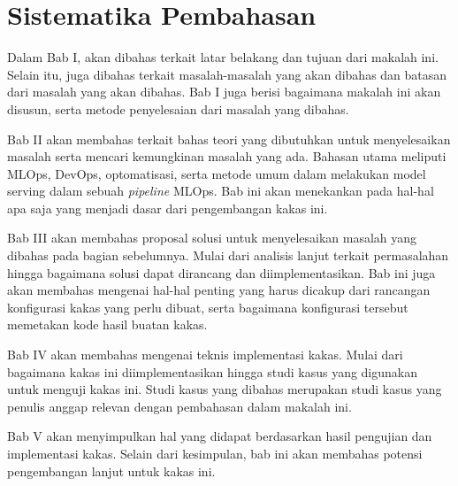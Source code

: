 \section{Sistematika Pembahasan}

Dalam Bab I, akan dibahas terkait latar belakang dan tujuan dari makalah ini.
Selain itu, juga dibahas terkait masalah-masalah yang akan dibahas dan batasan dari masalah yang akan dibahas.
Bab I juga berisi bagaimana makalah ini akan disusun, serta metode penyelesaian dari masalah yang dibahas.

Bab II akan membahas terkait bahas teori yang dibutuhkan untuk menyelesaikan masalah serta mencari kemungkinan masalah yang ada.
Bahasan utama meliputi MLOps, DevOps, optomatisasi, serta metode umum dalam melakukan model serving dalam sebuah \textit{pipeline} MLOps.
Bab ini akan menekankan pada hal-hal apa saja yang menjadi dasar dari pengembangan kakas ini.

Bab III akan membahas proposal solusi untuk menyelesaikan masalah yang dibahas pada bagian sebelumnya.
Mulai dari analisis lanjut terkait permasalahan hingga bagaimana solusi dapat dirancang dan diimplementasikan.
Bab ini juga akan membahas mengenai hal-hal penting yang harus dicakup dari rancangan konfigurasi kakas yang perlu dibuat, serta bagaimana konfigurasi tersebut memetakan kode hasil buatan kakas.

Bab IV akan membahas mengenai teknis implementasi kakas.
Mulai dari bagaimana kakas ini diimplementasikan hingga studi kasus yang digunakan untuk menguji kakas ini.
Studi kasus yang dibahas merupakan studi kasus yang penulis anggap relevan dengan pembahasan dalam makalah ini.

Bab V akan menyimpulkan hal yang didapat berdasarkan hasil pengujian dan implementasi kakas.
Selain dari kesimpulan, bab ini akan membahas potensi pengembangan lanjut untuk kakas ini.